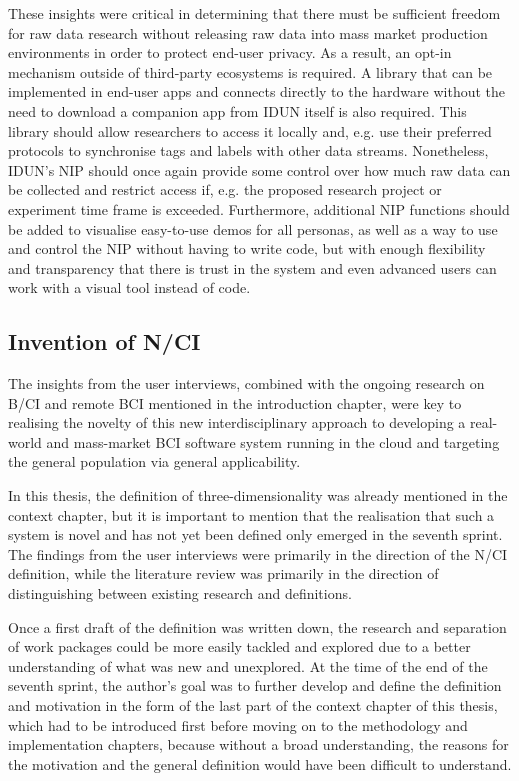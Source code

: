 These insights were critical in determining that there must be sufficient freedom for raw data research without releasing raw data into mass market production environments in order to protect end-user privacy. As a result, an opt-in mechanism outside of third-party ecosystems is required. A library that can be implemented in end-user apps and connects directly to the hardware without the need to download a companion app from IDUN itself is also required. This library should allow researchers to access it locally and, e.g. use their preferred protocols to synchronise tags and labels with other data streams. Nonetheless, IDUN's NIP should once again provide some control over how much raw data can be collected and restrict access if, e.g. the proposed research project or experiment time frame is exceeded. Furthermore, additional NIP functions should be added to visualise easy-to-use demos for all personas, as well as a way to use and control the NIP without having to write code, but with enough flexibility and transparency that there is trust in the system and even advanced users can work with a visual tool instead of code.

\subsection{Invention of N/CI}
\label{chapter4-invention-of-nci}

The insights from the user interviews, combined with the ongoing research on B/CI and remote BCI mentioned in the introduction chapter, were key to realising the novelty of this new interdisciplinary approach to developing a real-world and mass-market BCI software system running in the cloud and targeting the general population via general applicability.

In this thesis, the definition of three-dimensionality was already mentioned in the context chapter, but it is important to mention that the realisation that such a system is novel and has not yet been defined only emerged in the seventh sprint. The findings from the user interviews were primarily in the direction of the N/CI definition, while the literature review was primarily in the direction of distinguishing between existing research and definitions.

Once a first draft of the definition was written down, the research and separation of work packages could be more easily tackled and explored due to a better understanding of what was new and unexplored. At the time of the end of the seventh sprint, the author's goal was to further develop and define the definition and motivation in the form of the last part of the context chapter of this thesis, which had to be introduced first before moving on to the methodology and implementation chapters, because without a broad understanding, the reasons for the motivation and the general definition would have been difficult to understand.

